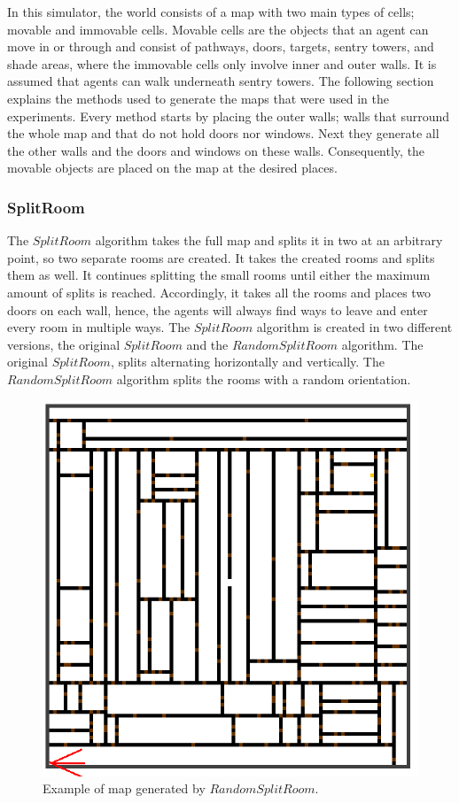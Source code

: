 
In this simulator, the world consists of a map with two main types of cells; movable and immovable cells. Movable cells are the objects that an agent can move in or through and consist of pathways, doors, targets, sentry towers, and shade areas, where the immovable cells only involve inner and outer walls. It is assumed that agents can walk underneath sentry towers. The following section explains the methods used to generate the maps that were used in the experiments.
Every method starts by placing the outer walls; walls that surround the whole map and that do not hold doors nor windows. Next they generate all the other walls and the doors and windows on these walls. Consequently, the movable objects are placed on the map at the desired places.

\subsubsection{SplitRoom}
The $SplitRoom$ algorithm takes the full map and splits it in two at an arbitrary point, so two separate rooms are created. It takes the created rooms and splits them as well. It continues splitting the small rooms until either the maximum amount of splits is reached. Accordingly, it takes all the rooms and places two doors on each wall, hence, the agents will always find ways to leave and enter every room in multiple ways.
The $SplitRoom$ algorithm is created in two different versions, the original $SplitRoom$ and the $RandomSplitRoom$ algorithm. The original $SplitRoom$, splits alternating horizontally and vertically. The $RandomSplitRoom$ algorithm splits the rooms with a random orientation.
\begin{figure}[H]
\centering
\includegraphics[width=\columnwidth]{images/randomRoom.png}
\caption{Example of map generated by $RandomSplitRoom$.}
\label{fig:maze05}
\end{figure}

